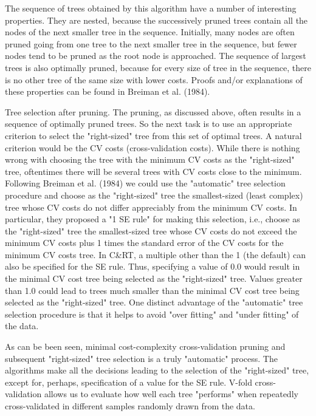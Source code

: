 The sequence of trees obtained by this algorithm have a number of interesting properties. They are nested, because the successively pruned trees contain all the nodes of the next smaller tree in the sequence. Initially, many nodes are often pruned going from one tree to the next smaller tree in the sequence, but fewer nodes tend to be pruned as the root node is approached. The sequence of largest trees is also optimally pruned, because for every size of tree in the sequence, there is no other tree of the same size with lower costs. Proofs and/or explanations of these properties can be found in Breiman et al. (1984).

Tree selection after pruning. The pruning, as discussed above, often results in a sequence of optimally pruned trees. So the next task is to use an appropriate criterion to select the "right-sized" tree from this set of optimal trees. A natural criterion would be the CV costs (cross-validation costs). While there is nothing wrong with choosing the tree with the minimum CV costs as the "right-sized" tree, oftentimes there will be several trees with CV costs close to the minimum. Following Breiman et al. (1984) we could use the "automatic" tree selection procedure and choose as the "right-sized" tree the smallest-sized (least complex) tree whose CV costs do not differ appreciably from the minimum CV costs. In particular, they proposed a "1 SE rule" for making this selection, i.e., choose as the "right-sized" tree the smallest-sized tree whose CV costs do not exceed the minimum CV costs plus 1 times the standard error of the CV costs for the minimum CV costs tree. In C&RT, a multiple other than the 1 (the default) can also be specified for the SE rule. Thus, specifying a value of 0.0 would result in the minimal CV cost tree being selected as the "right-sized" tree. Values greater than 1.0 could lead to trees much smaller than the minimal CV cost tree being selected as the "right-sized" tree. One distinct advantage of the "automatic" tree selection procedure is that it helps to avoid "over fitting" and "under fitting" of the data.

As can be been seen, minimal cost-complexity cross-validation pruning and subsequent "right-sized" tree selection is a truly "automatic" process. The algorithms make all the decisions leading to the selection of the "right-sized" tree, except for, perhaps, specification of a value for the SE rule. V-fold cross-validation allows us to evaluate how well each tree "performs" when repeatedly cross-validated in different samples randomly drawn from the data.


